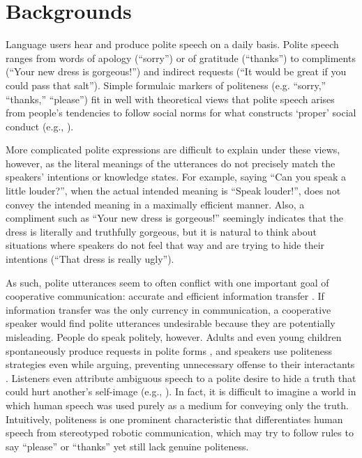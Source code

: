 \section{Backgrounds}\label{sec:backg}

Language users hear and produce polite speech on a daily basis. Polite speech ranges from words of apology (``sorry'') or of gratitude (``thanks'') to compliments (``Your new dress is gorgeous!'') and indirect requests (``It would be great if you could pass that salt''). Simple formulaic markers of politeness (e.g. ``sorry,'' ``thanks,'' ``please'') fit in well with theoretical views that polite speech arises from people's tendencies to follow social norms for what constructs `proper' social conduct (e.g., \citealt{ide1989}).

More complicated polite expressions are difficult to explain under these views, however, as the literal meanings of the utterances do not precisely match the speakers' intentions or knowledge states. For example, saying ``Can you speak a little louder?'', when the actual intended meaning is ``Speak louder!'', does not convey the intended meaning in a maximally efficient manner. Also, a compliment such as ``Your new dress is gorgeous!'' seemingly indicates that the dress is literally and truthfully gorgeous, but it is natural to think about situations where speakers do not feel that way and are trying to hide their intentions (``That dress is really ugly'').

As such, polite utterances seem to often conflict with one important goal of cooperative communication: accurate and efficient information transfer \citep{Grice1975}. If information transfer was the only currency in communication, a cooperative speaker would find polite utterances undesirable because they are potentially misleading. People do speak politely, however. Adults and even young children spontaneously produce requests in polite forms \citep{clark1980, axia1985}, and speakers use politeness strategies even while arguing, preventing unnecessary offense to their interactants \citep{holtgraves1997}. Listeners even attribute ambiguous speech to a polite desire to hide a truth that could hurt another's self-image (e.g., \citealt{bonnefon2009}). In fact, it is difficult to imagine a world in which human speech was used purely as a medium for conveying only the truth. Intuitively, politeness is one prominent characteristic that differentiates human speech from stereotyped robotic communication, which may try to follow rules to say ``please'' or ``thanks'' yet still lack genuine politeness.

